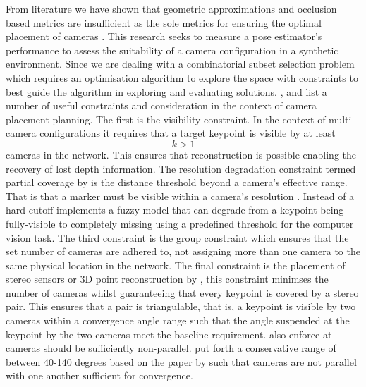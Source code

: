 From literature we have shown that geometric approximations and occlusion based metrics are insufficient as the sole metrics for ensuring the optimal placement of cameras . This research seeks to measure a pose estimator's performance to assess the suitability of a camera configuration in a synthetic environment.
Since we are dealing with a combinatorial subset selection problem which requires an optimisation algorithm to explore the space with constraints to best guide the algorithm in exploring and evaluating solutions.
\cite{zhao2013approximate}, \cite{rahimian2016optimal} and \citet{aissaoui2018designing} list a number of useful constraints and consideration in the context of camera placement planning. The first is the visibility constraint. In the context of multi-camera configurations it requires that a target keypoint is visible by at least $$k > 1 $$ cameras in the network. This ensures that reconstruction is possible enabling the recovery of lost depth information. 
The resolution degradation constraint termed partial coverage by \cite{zhao2013approximate} is the distance threshold beyond a camera's effective range. That is that a marker must be visible within a camera's resolution \cite{aissaoui2018designing}. Instead of a hard cutoff \citet{zhao2013approximate} implements a fuzzy model that can degrade from a keypoint being fully-visible to completely missing using a predefined threshold for the computer vision task. 
The third constraint is the group constraint which ensures that the set number of cameras are adhered to, not assigning more than one camera to the same physical location in the network.
The final constraint is the placement of stereo sensors or 3D point reconstruction by \citet{rahimian2016optimal}, this constraint minimses the number of cameras whilst guaranteeing that every keypoint is covered by a stereo pair. This ensures that a pair is triangulable, that is, a keypoint is visible by two cameras within a convergence angle range such that the angle suspended at the keypoint by the two cameras meet the baseline requirement. \citet{aissaoui2018designing} also enforce at cameras should be sufficiently non-parallel. \cite{rahimian2016optimal} put forth a conservative range of between 40-140 degrees based on the paper by \cite{olague2002optimal} such that cameras are not parallel with one another sufficient for convergence. 




